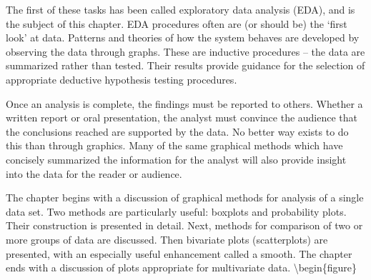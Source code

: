 \documentclass[]{book}
\begin{document}
The first of these tasks has been called exploratory data analysis (EDA), and is the subject of this chapter. EDA procedures often are (or should be) the `first look' at data. Patterns and theories of how the system behaves are developed by observing the data through graphs. These are inductive procedures -- the data are summarized rather than tested. Their results provide guidance for the selection of appropriate deductive hypothesis testing procedures.

Once an analysis is complete, the findings must be reported to others. Whether a written report or oral presentation, the analyst must convince the audience that the conclusions reached are supported by the data. No better way exists to do this than through graphics. Many of the same graphical methods which have concisely summarized the information for the analyst will also provide insight into the data for the reader or audience.

The chapter begins with a discussion of graphical methods for analysis of a single data set. Two methods are particularly useful: boxplots and probability plots. Their construction is presented in detail. Next, methods for comparison of two or more groups of data are discussed. Then bivariate plots (scatterplots) are presented, with an especially useful enhancement called a smooth. The chapter ends with a discussion of plots appropriate for multivariate data.
\textbackslash{}begin\{figure\}
\end{document}
